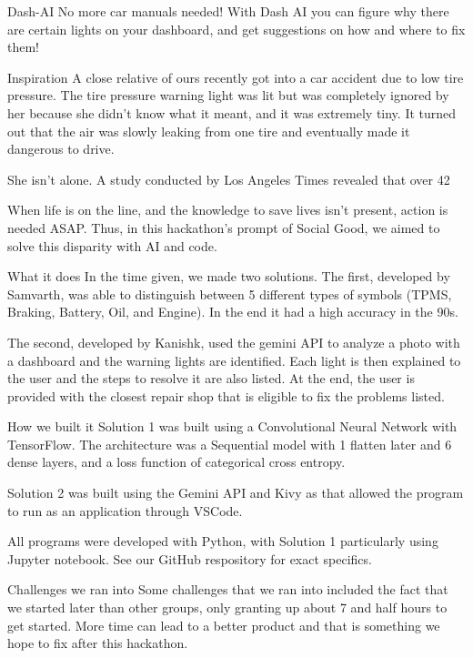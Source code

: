 Dash-AI
No more car manuals needed! With Dash AI you can figure why there are certain lights on your dashboard, and get suggestions on how and where to fix them!

Inspiration
A close relative of ours recently got into a car accident due to low tire pressure. The tire pressure warning light was lit but was completely ignored by her because she didn't know what it meant, and it was extremely tiny. It turned out that the air was slowly leaking from one tire and eventually made it dangerous to drive.

She isn't alone. A study conducted by Los Angeles Times revealed that over 42%

When life is on the line, and the knowledge to save lives isn't present, action is needed ASAP. Thus, in this hackathon's prompt of Social Good, we aimed to solve this disparity with AI and code.

What it does
In the time given, we made two solutions. The first, developed by Samvarth, was able to distinguish between 5 different types of symbols (TPMS, Braking, Battery, Oil, and Engine). In the end it had a high accuracy in the 90s.

The second, developed by Kanishk, used the gemini API to analyze a photo with a dashboard and the warning lights are identified. Each light is then explained to the user and the steps to resolve it are also listed. At the end, the user is provided with the closest repair shop that is eligible to fix the problems listed.

How we built it
Solution 1 was built using a Convolutional Neural Network with TensorFlow. The architecture was a Sequential model with 1 flatten later and 6 dense layers, and a loss function of categorical cross entropy.

Solution 2 was built using the Gemini API and Kivy as that allowed the program to run as an application through VSCode.

All programs were developed with Python, with Solution 1 particularly using Jupyter notebook. See our GitHub respository for exact specifics.

Challenges we ran into
Some challenges that we ran into included the fact that we started later than other groups, only granting up about 7 and half hours to get started. More time can lead to a better product and that is something we hope to fix after this hackathon.

